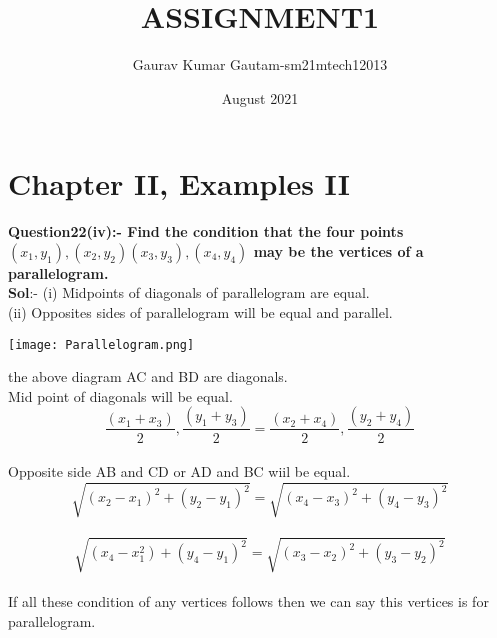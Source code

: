 \documentclass[12pt]{article}
\title{ASSIGNMENT1}
\author{Gaurav Kumar Gautam-sm21mtech12013}\\
\date{August 2021}
\begin{document}
\maketitle
\section*{Chapter II, Examples II}


\textbf{ Question22(iv):- Find the condition that the four points $(x_1,y_1),(x_2,y_2)(x_3,y_3),(x_4,y_4)$ may be the vertices of a parallelogram.}\\[6pt]
\textbf{Sol}:- (i) Midpoints of diagonals of parallelogram are equal.\\[6pt]
 (ii) Opposites sides of parallelogram will be equal and parallel.
 \begin{center}
     \texttt{[image: Parallelogram.png]}
 \end{center}
\In the above diagram AC and BD are diagonals.\\
Mid point of diagonals will be equal.
$$\frac{(x_1+x_3)}{2},\frac{(y_1+y_3)}{2}=\frac{(x_2+x_4)}{2},\frac{(y_2+y_4)}{2}$$\\
Opposite side AB and CD or AD and BC wiil be equal.\\
$$\sqrt{(x_2-x_1)^2 + (y_2-y_1)^2}=\sqrt{(x_4-x_3)^2 + (y_4-y_3)^2}$$\\
$$\sqrt{(x_4-x_1^2) + (y_4-y_1)^2}=\sqrt{(x_3-x_2)^2+(y_3-y_2)^2}$$\\
If all these condition of any vertices follows then we can say this vertices is for parallelogram.
\end{document}
